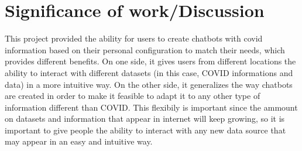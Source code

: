 \documentclass[]{article}
\begin{document}
\section*{Significance of work/Discussion}
This project provided the ability for users to create chatbots with covid information based on their personal configuration to match their needs, which provides different benefits. On one side, it gives users from different locations the ability to interact with different datasets (in this case, COVID informations and data) in a more intuitive way. On the other side, it generalizes the way chatbots are created in order to make it feasible to adapt it to any other type of information different than COVID. This flexibily is important since the ammount on datasets and information that appear in internet will keep growing, so it is important to give people the ability to interact with any new data source that may appear in an easy and intuitive way.



\end{document}
